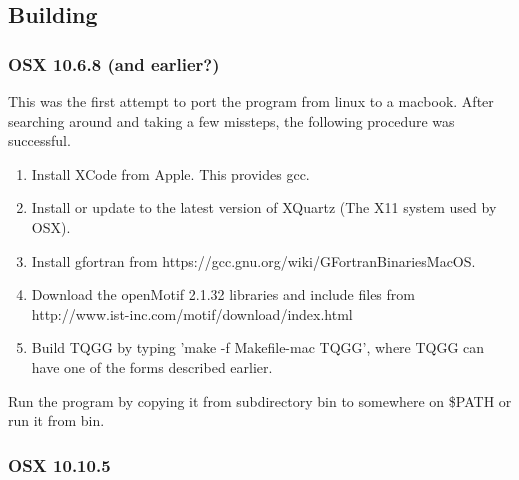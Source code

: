 \documentclass[10pt]{article}
\begin{document}
\subsection{Building}

\subsubsection{OSX 10.6.8 (and earlier?)}

This was the first attempt to port the program from linux to a macbook. After searching around
and taking a few missteps, the following procedure was successful.

\begin{enumerate}
 \item Install XCode from Apple. This provides gcc.
 \item Install or update to the latest version of XQuartz (The X11 system used by OSX). 
 \item Install gfortran from https://gcc.gnu.org/wiki/GFortranBinariesMacOS.
 \item Download the openMotif 2.1.32 libraries and include files from \\
 http://www.ist-inc.com/motif/download/index.html
 \item Build TQGG by typing 'make -f Makefile-mac TQGG', where TQGG can have one of the forms described earlier.
\end{enumerate}

Run the program by copying it from subdirectory bin to somewhere on \$PATH or run it from bin. 

\subsubsection{OSX 10.10.5}
\end{document}

